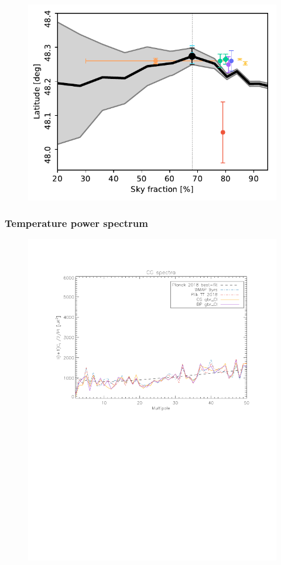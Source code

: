 \documentclass[twocolumn]{../../common/aa}
\begin{document}
\begin{figure}
	\includegraphics[width=\columnwidth]{figures/dip_latitude.pdf}
\end{figure}

\subsubsection{Temperature power spectrum}
\label{sec:cls}

\begin{figure}
	\includegraphics[width=\columnwidth]{figures/GaussCl_CG_lmax50.pdf}
\end{figure}
\end{document}
